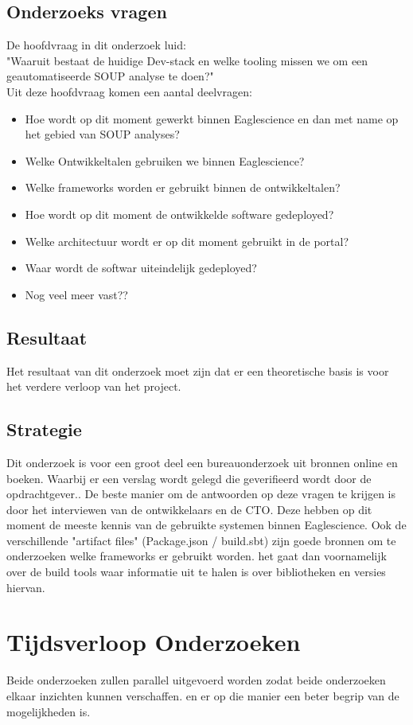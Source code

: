 \subsection{Onderzoeks vragen}
De hoofdvraag in dit onderzoek luid: \\
"Waaruit bestaat de huidige Dev-stack en welke tooling missen we om een geautomatiseerde SOUP analyse te doen?"\\
Uit deze hoofdvraag komen een aantal deelvragen:

\begin{itemize}
  \item Hoe wordt op dit moment gewerkt binnen Eaglescience en dan met name op het gebied van SOUP analyses?
  \item Welke Ontwikkeltalen gebruiken we binnen Eaglescience?
  \item Welke frameworks worden er gebruikt binnen de ontwikkeltalen?
  \item Hoe wordt op dit moment de ontwikkelde software gedeployed?
  \item Welke architectuur wordt er op dit moment gebruikt in de portal?
  \item Waar wordt de softwar uiteindelijk gedeployed?
  \item Nog veel meer vast??
\end{itemize}

\subsection{Resultaat}%
Het resultaat van dit onderzoek moet zijn dat er een theoretische basis is voor het verdere verloop van het project.
\subsection{Strategie}
Dit onderzoek is voor een groot deel een bureauonderzoek uit bronnen online en boeken. Waarbij er een verslag wordt gelegd die geverifieerd wordt door de opdrachtgever..
De beste manier om de antwoorden op deze vragen te krijgen is door het interviewen van de ontwikkelaars en de CTO. Deze hebben op dit moment de meeste kennis van de gebruikte systemen binnen Eaglescience. Ook de verschillende "artifact files" (Package.json / build.sbt) zijn goede bronnen om te onderzoeken welke frameworks er gebruikt worden. het gaat dan voornamelijk over de build tools waar informatie uit te halen is over bibliotheken en versies hiervan.

\section{Tijdsverloop Onderzoeken}
Beide onderzoeken zullen parallel uitgevoerd worden zodat beide onderzoeken elkaar inzichten kunnen verschaffen. en er op die manier een beter begrip van de mogelijkheden is.
